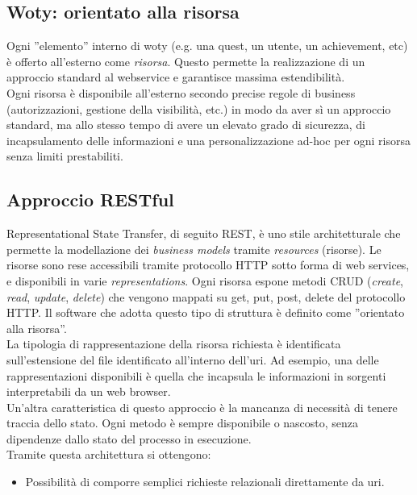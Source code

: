 {{\subsection{Woty: orientato alla risorsa}
Ogni ''elemento'' interno di woty (e.g. una quest, un utente, un achievement, etc) è offerto all'esterno come \emph{risorsa}. Questo permette la realizzazione di un approccio standard al webservice e garantisce massima estendibilità. \\
Ogni risorsa è disponibile all'esterno secondo precise regole di business (autorizzazioni, gestione della visibilità, etc.) in modo da aver sì un approccio standard, ma allo stesso tempo di avere un elevato grado di sicurezza, di incapsulamento delle informazioni e una personalizzazione ad-hoc per ogni risorsa senza limiti prestabiliti.


\subsection{Approccio RESTful}

Representational State Transfer, di seguito REST, è uno stile architetturale che permette la modellazione dei \emph{business models} tramite \emph{resources} (risorse). Le risorse sono rese accessibili tramite protocollo HTTP sotto forma di web services, e disponibili in varie \emph{representations}. Ogni risorsa espone metodi CRUD (\emph{create}, \emph{read}, \emph{update}, \emph{delete}) che vengono mappati su get, put, post, delete del protocollo HTTP. Il software che adotta questo tipo di struttura è definito come ''orientato alla risorsa''.\\

La tipologia di rappresentazione della risorsa richiesta è identificata sull'estensione del file identificato all'interno dell'uri. Ad esempio, una delle rappresentazioni disponibili è quella che incapsula le informazioni in sorgenti interpretabili da un web browser.\\ 

Un'altra caratteristica di questo approccio è la mancanza di necessità di tenere traccia dello stato. Ogni metodo è sempre disponibile o nascosto, senza dipendenze dallo stato del processo in esecuzione.\\ 
Tramite questa architettura si ottengono:

\begin{itemize}
			
\item Possibilità di comporre semplici richieste relazionali direttamente da uri.


\end{itemize}}}
